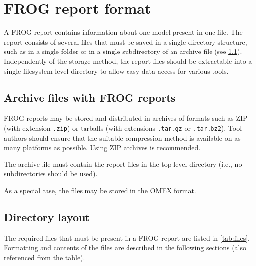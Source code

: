 \chapter{FROG report format}
\label{chap:spec}

A FROG report contains information about one model present in one file.
The report consists of several files that must be saved in a single directory structure, such as in a single folder or in a single subdirectory of an archive file (see \cref{sec:archives}).
Independently of the storage method, the report files should be extractable into a single filesystem-level directory to allow easy data access for various tools.

\section{Archive files with FROG reports}
\label{sec:archives}

FROG reports may be stored and distributed in archives of formats such as ZIP (with extension \texttt{.zip}) or tarballs (with extensions \texttt{.tar.gz} or \texttt{.tar.bz2}).
Tool authors should ensure that the suitable compression method is available on as many platforms as possible. Using ZIP archives is recommended.

The archive file must contain the report files in the top-level directory (i.e., no subdirectories should be used).

As a special case, the files may be stored in the OMEX format.

\section{Directory layout}
\label{sec:files}

The required files that must be present in a FROG report are listed in \cref{tab:files}. Formatting and contents of the files are described in the following sections (also referenced from the table).

